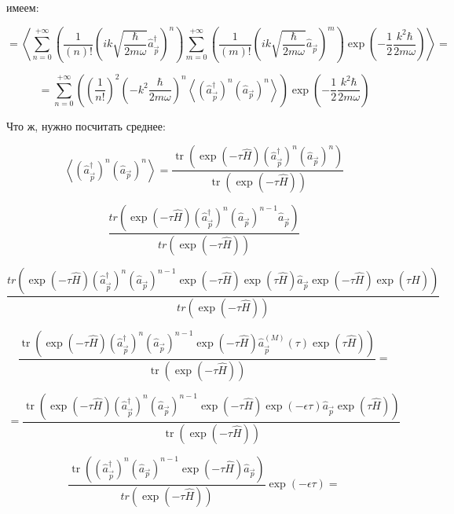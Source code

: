 \documentclass[a4paper,12pt]{article} %
\begin{document}
\begin{ttask}
имеем:



$$
=\left\langle\sum_{n=0}^{+\infty}\left(\frac{1}{(n) !}\left(i k \sqrt{\frac{\hbar}{2 m \omega}} \hat{a}_{\vec{p}}^{\dagger}\right)^{n}\right) \sum_{m=0}^{+\infty}\left(\frac{1}{(m) !}\left(i k \sqrt{\frac{\hbar}{2 m \omega}} \hat{a}_{\vec{p}}\right)^{m}\right) \exp \left(-\frac{1}{2} \frac{k^{2} \hbar}{2 m \omega}\right)\right\rangle=
$$


$$
=\sum_{n=0}^{+\infty}\left(\left(\frac{1}{n !}\right)^{2}\left(-k^{2} \frac{\hbar}{2 m \omega}\right)^{n}\left\langle\left(\hat{a}_{\vec{p}}^{\dagger}\right)^{n}\left(\hat{a}_{\vec{p}}\right)^{n}\right\rangle\right) 
\exp \left(-\frac{1}{2} \frac{k^{2} \hbar}{2 m \omega}\right)
$$


Что ж, нужно посчитать среднее:


$$
\left\langle\left(\hat{a}_{\vec{p}}^{\dagger}\right)^{n}\left(\hat{a}_{\vec{p}}\right)^{n}\right\rangle=\frac{\operatorname{tr}\left(\exp (-\tau \hat{H})\left(\hat{a}_{\vec{p}}^{\dagger}\right)^{n}\left(\hat{a}_{\vec{p}}\right)^{n}\right)}{\operatorname{tr}(\exp (-\tau \hat{H}))}
$$

$$
\frac{t r\left(\exp (-\tau \hat{H})\left(\hat{a}_{\vec{p}}^{\dagger}\right)^{n}\left(\hat{a}_{\vec{p}}\right)^{n-1} \hat{a}_{\vec{p}}\right)}{t r(\exp (-\tau \hat{H}))}
$$




$$
\frac{t r\left(\exp (-\tau \hat{H})\left(\hat{a}_{\vec{p}}^{\dagger}\right)^{n}\left(\hat{a}_{\vec{p}}\right)^{n-1} \exp (-\tau \hat{H}) \exp (\tau \hat{H}) \hat{a}_{\vec{p}} \exp (-\tau \hat{H}) \exp (\tau \hat{H})\right)}{t r(\exp (-\tau \hat{H}))}
$$



$$
\frac{\operatorname{tr}\left(\exp (-\tau \hat{H})\left(\hat{a}_{\vec{p}}^{\dagger}\right)^{n}\left(\hat{a}_{\vec{p}}\right)^{n-1} \exp (-\tau \hat{H}) \hat{a}_{\vec{p}}^{(M)}(\tau) \exp (\tau \hat{H})\right)}{\operatorname{tr}(\exp (-\tau \hat{H}))}=
$$




$$
=\frac{\operatorname{tr}\left(\exp (-\tau \hat{H})\left(\hat{a}_{\vec{p}}^{\dagger}\right)^{n}\left(\hat{a}_{\vec{p}}\right)^{n-1} \exp (-\tau \hat{H}) \exp (-\epsilon \tau) \hat{a}_{\vec{p}} \exp (\tau \hat{H})\right)}{\operatorname{tr}(\exp (-\tau \hat{H}))}
$$




$$
\frac{\operatorname{tr}\left(\left(\hat{a}_{\vec{p}}^{\dagger}\right)^{n}\left(\hat{a}_{\vec{p}}\right)^{n-1} \exp (-\tau \hat{H}) \hat{a}_{\vec{p}}\right)}{t r(\exp (-\tau \hat{H}))} \exp (-\epsilon \tau)=
$$



\end{ttask}
\end{document}
